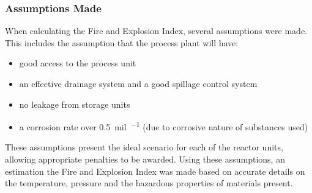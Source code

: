\subsubsection{Assumptions Made }

When calculating the Fire and Explosion Index, several assumptions were made. This includes the assumption that the process plant will have:
\begin{itemize}
\item good access to the process unit
\item an effective drainage system and a good spillage control system
\item no leakage from storage units 
\item a corrosion rate over \SI{0.5}{mil\per\year} (due to corrosive nature of substances used)
\end{itemize}

These assumptions present the ideal scenario for each of the reactor units, allowing appropriate penalties to be awarded. Using these assumptions, an estimation the Fire and Explosion Index was made based on accurate details on the temperature, pressure and the hazardous properties of materials present. 

